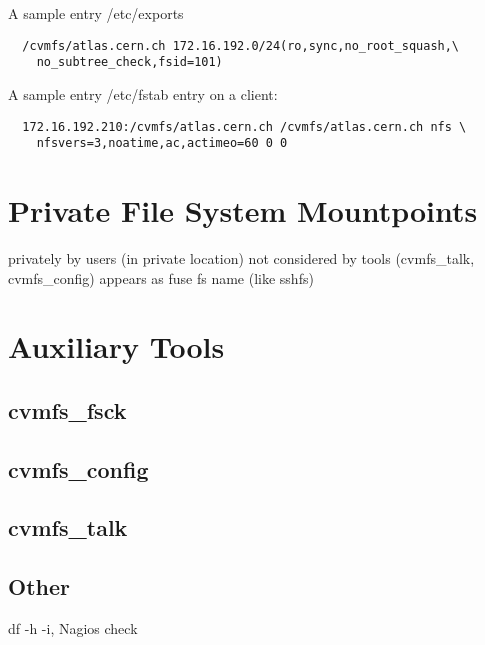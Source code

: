 A sample entry /etc/exports
\begin{verbatim}
  /cvmfs/atlas.cern.ch 172.16.192.0/24(ro,sync,no_root_squash,\
    no_subtree_check,fsid=101)
\end{verbatim}
A sample entry /etc/fstab entry on a client:
\begin{verbatim}
  172.16.192.210:/cvmfs/atlas.cern.ch /cvmfs/atlas.cern.ch nfs \
    nfsvers=3,noatime,ac,actimeo=60 0 0
\end{verbatim}


\section{Private File System Mountpoints}
privately by users (in private location)
not considered by tools (cvmfs\_talk, cvmfs\_config)
appears as fuse fs name (like sshfs)


\section{Auxiliary Tools}
\label{sct:tools}

\subsection{cvmfs\_fsck}

\subsection{cvmfs\_config}

\subsection{cvmfs\_talk}

\subsection{Other}
df -h -i, 
Nagios check


